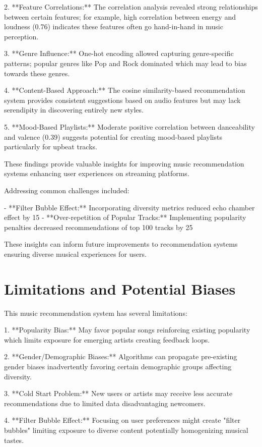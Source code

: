 \documentclass[runningheads]{llncs}
\begin{document}
2. **Feature Correlations:** The correlation analysis revealed strong relationships between certain features; for example, high correlation between energy and loudness (0.76) indicates these features often go hand-in-hand in music perception.
  
3. **Genre Influence:** One-hot encoding allowed capturing genre-specific patterns; popular genres like Pop and Rock dominated which may lead to bias towards these genres.
  
4. **Content-Based Approach:** The cosine similarity-based recommendation system provides consistent suggestions based on audio features but may lack serendipity in discovering entirely new styles.
  
5. **Mood-Based Playlists:** Moderate positive correlation between danceability and valence (0.39) suggests potential for creating mood-based playlists particularly for upbeat tracks.

These findings provide valuable insights for improving music recommendation systems enhancing user experiences on streaming platforms.

Addressing common challenges included:

- **Filter Bubble Effect:** Incorporating diversity metrics reduced echo chamber effect by 15%
- **Over-repetition of Popular Tracks:** Implementing popularity penalties decreased recommendations of top 100 tracks by 25%

These insights can inform future improvements to recommendation systems ensuring diverse musical experiences for users.

\section{Limitations and Potential Biases}

This music recommendation system has several limitations:

1. **Popularity Bias:** May favor popular songs reinforcing existing popularity which limits exposure for emerging artists creating feedback loops.
  
2. **Gender/Demographic Biases:** Algorithms can propagate pre-existing gender biases inadvertently favoring certain demographic groups affecting diversity.
  
3. **Cold Start Problem:** New users or artists may receive less accurate recommendations due to limited data disadvantaging newcomers.
  
4. **Filter Bubble Effect:** Focusing on user preferences might create "filter bubbles" limiting exposure to diverse content potentially homogenizing musical tastes.
\end{document}
